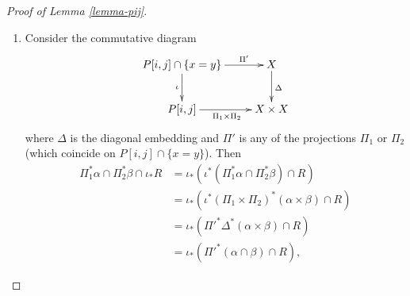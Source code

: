 \begin{proof}[Proof of Lemma \ref{lemma-pij}]
\begin{enumerate}
The setting is the following. We have the
ideals with contentions
$\mathcal{J}_1\supset
\mathcal{J}_2,\mathcal{J}_2'\supset
\mathcal{J}_3$.
Passing to the supports, the inclusions are
reversed, i.e
the support of $\mathcal{J}_3$ contains the
rest,
and the support of $\mathcal{J}_1$ is
contained in the rest.

To prove that this function is well-defined
we need to show that for every
$\mathcal{J}_2$ there is a unique
$\mathcal{J}_2'$ satisfying Equation
\ref{equation-isomorphism}.
Notice that by definition,
$\text{supp}\mathcal{J}_2/\mathcal{J}_3=\{x\}$
for some $x \in X$ so that, as a scheme,
$\{x\}$ has multiplicity $j$.
We define
$\mathcal{J}_2'=\mathcal{J}_1\cup \{x\}$
where $x$ has multiplicity $j$.

\medskip\noindent
(Caveat: it looks to me that the choice of
$\mathcal{J}_2'$ is not unique.
Indeed, the space of schemes of length $j$
supported
in the point $x$ was discussed in the proof
of Lemma \ref{lemma-dimension},
where we used the fact that it has dimension
$j-1$.)

\medskip\noindent
Defining $\mathcal{J}'_2$ this way implies
that
$$
\mathcal{J}_1/\mathcal{J}_2'=\mathcal{J}_1/(\mathcal{J}_1\cup \{x\})
=\{x\}=\mathcal{J}_2/\mathcal{J}_3.
$$
Now, we also must have
$\mathcal{J}_1/\mathcal{J}_2=\{y\}$
for some $y \in X$ with multiplicity $i$.
This implies that
$\mathcal{J}_1/\mathcal{J}_3=\{x\}\cup
\{y\}$
with their multiplicities.
Then
$$
\mathcal{J}_2'/\mathcal{J}_3=(\mathcal{J}_1\cup \{x\})/\mathcal{J}_3=\{y\}
=\mathcal{J}_1/\mathcal{J}_2
$$
as required.
An inverse function
defined similarly shows this is a bijection.

\item Consider the commutative diagram
$$
\xymatrix{
P[i,j]\cap
\{x=y\}\ar[r]^-{\Pi'}\ar[d]_{\iota}&X\ar[d]^{\Delta}\\
P[i,j]\ar[r]_{\Pi_1 \times \Pi_2}&X \times X
}
$$
where $\Delta$ is the diagonal embedding
and $\Pi'$ is any of the projections $\Pi_1$
or $\Pi_2$
(which coincide on  $P[i,j]\cap \{x=y\}$).
Then
\begin{equation}
\label{equation-lemma2-1}
\begin{aligned}
\Pi_1^*\alpha \cap \Pi_2^*\beta \cap\iota_*R
&=\iota_*(\iota^*(\Pi_1^*\alpha\cap\Pi_2^*\beta)\cap R)\\
&=\iota_*(\iota^*(\Pi_1\times\Pi_2)^*(\alpha\times\beta)\cap R)\\
&=\iota_*({\Pi'}^*\Delta^*(\alpha\times\beta)\cap R)\\
&=\iota_*({\Pi'}^*(\alpha\cap\beta)\cap R),
\end{aligned}
\end{equation}


\end{enumerate}
\end{proof}
